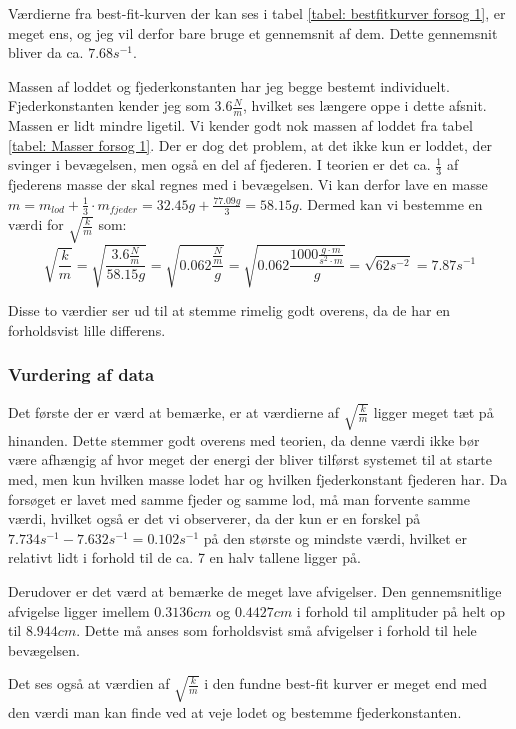 Værdierne fra best-fit-kurven der kan ses i tabel \ref{tabel: bestfitkurver forsog 1}, er meget ens, og jeg vil derfor bare bruge et gennemsnit af dem. 
Dette gennemsnit bliver da ca. $7.68s^{-1}$.

Massen af loddet og fjederkonstanten har jeg begge bestemt individuelt. 
Fjederkonstanten kender jeg som $3.6\frac{N}{m}$, hvilket ses længere oppe i dette afsnit. 
Massen er lidt mindre ligetil. 
Vi kender godt nok massen af loddet fra tabel \ref{tabel: Masser forsog 1}. 
Der er dog det problem, at det ikke kun er loddet, der svinger i bevægelsen, men også en del af fjederen. 
I teorien er det ca. $\frac{1}{3}$ af fjederens masse der skal regnes med i bevægelsen.
Vi kan derfor lave en masse $m=m_{lod}+\frac{1}{3}\cdot m_{fjeder}=32.45g+\frac{77.09g}{3}=58.15g$. 
Dermed kan vi bestemme en værdi for $\sqrt{\frac{k}{m}}$ som:
$$\sqrt{\frac{k}{m}}=\sqrt{\frac{3.6\frac{N}{m}}{58.15g}}=\sqrt{0.062\frac{\frac{N}{m}}{g}}=\sqrt{0.062\frac{1000\frac{g\cdot m}{s^2\cdot m}}{g}}=\sqrt{62s^{-2}}=7.87s^{-1}$$

Disse to værdier ser ud til at stemme rimelig godt overens, da de har en forholdsvist lille differens. 



\subsubsection{Vurdering af data}\label{exp1: Vurdering af data}
Det første der er værd at bemærke, er at værdierne af $\sqrt{\frac{k}{m}}$ ligger meget tæt på hinanden. 
Dette stemmer godt overens med teorien, da denne værdi ikke bør være afhængig af hvor meget der energi der bliver tilførst systemet til at starte med, men kun hvilken masse lodet har og hvilken fjederkonstant fjederen har. 
Da forsøget er lavet med samme fjeder og samme lod, må man forvente samme værdi, hvilket også er det vi observerer, da der kun er en forskel på $7.734s^{-1}-7.632s^{-1}=0.102s^{-1}$ på den største og mindste værdi, hvilket er relativt lidt i forhold til de ca. 7 en halv tallene ligger på.



Derudover er det værd at bemærke de meget lave afvigelser. 
Den gennemsnitlige afvigelse ligger imellem $0.3136cm$ og $0.4427cm$ i forhold til amplituder på helt op til $8.944cm$. 
Dette må anses som forholdsvist små afvigelser i forhold til hele bevægelsen.

Det ses også at værdien af $\sqrt{\frac{k}{m}}$ i den fundne best-fit kurver er meget end med den værdi man kan finde ved at veje lodet og bestemme fjederkonstanten.

